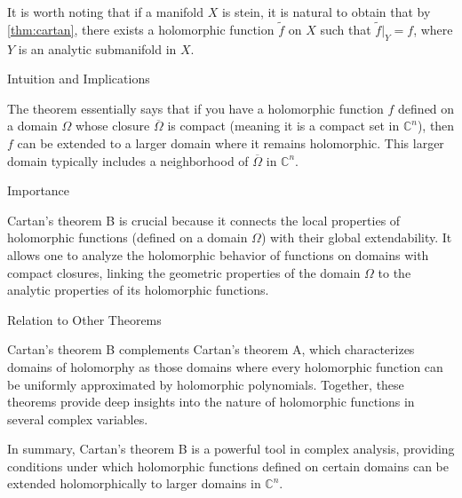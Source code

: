 \documentclass[lang=en,12pt]{beautybook}
\begin{document}
\begin{remark}
  It is worth noting that if a manifold $X$ is stein, it is natural to obtain that by \autoref{thm:cartan},  there exists a holomorphic function $\widetilde{f}$ on $X$ such that $\widetilde{f}|_Y=f$, where $Y$ is  an analytic submanifold in $X$.  
\end{remark}
Intuition and Implications

The theorem essentially says that if you have a holomorphic function \( f \) defined on a domain \( \Omega \) whose closure \( \overline{\Omega} \) is compact (meaning it is a compact set in \( \mathbb{C}^n \)), then \( f \) can be extended to a larger domain where it remains holomorphic. This larger domain typically includes a neighborhood of \( \overline{\Omega} \) in \( \mathbb{C}^n \).

Importance

Cartan's theorem B is crucial because it connects the local properties of holomorphic functions (defined on a domain \( \Omega \)) with their global extendability. It allows one to analyze the holomorphic behavior of functions on domains with compact closures, linking the geometric properties of the domain \( \Omega \) to the analytic properties of its holomorphic functions.

Relation to Other Theorems

Cartan's theorem B complements Cartan's theorem A, which characterizes domains of holomorphy as those domains where every holomorphic function can be uniformly approximated by holomorphic polynomials. Together, these theorems provide deep insights into the nature of holomorphic functions in several complex variables.

In summary, Cartan's theorem B is a powerful tool in complex analysis, providing conditions under which holomorphic functions defined on certain domains can be extended holomorphically to larger domains in \( \mathbb{C}^n \).
















\printbibliography[heading=bibintoc,title={Bibliography}]\printindex\thispagestyle{empty}
\ISBNcode{\EANisbn[ISBN=978-80-7340-097-2]} %
\makebottomcover
\end{document}
